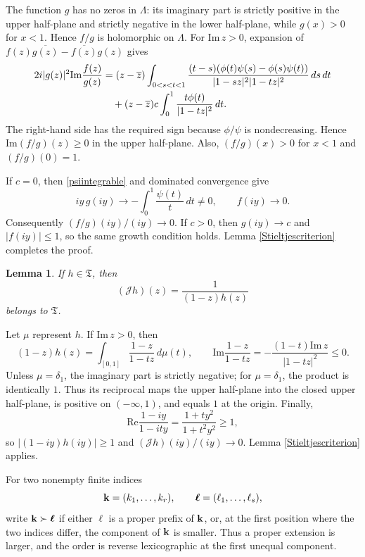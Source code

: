 \documentclass[12pt,a4paper]{amsart}
\makeatletter
\numberwithin{equation}{section}
\renewenvironment{proof}[1][Proof]{%
  \par\pushQED{\qed}%
  \normalfont\topsep6\p@\@plus6\p@\relax
  \trivlist
  \item[\hskip\labelsep\bfseries #1:]\ignorespaces
}{%
  \popQED\endtrivlist\@endpefalse
}
\theoremstyle{plain}
\newtheorem{lem}[Thm]{Lemma}
\theoremstyle{definition}
\makeatother
\begin{document}
\begin{proof}
The function $g$ has no zeros in $\Lambda$: its imaginary part is strictly positive in the upper half-plane and strictly negative in the lower half-plane, while $g(x)>0$ for $x<1$.  Hence $f/g$ is holomorphic on $\Lambda$.  For $\mathrm{Im}\,z>0$, expansion of
$f(z)\overline{g(z)}-\overline{f(z)}g(z)$ gives
\begin{align}
2i|g(z)|^2\mathrm{Im}\frac{f(z)}{g(z)}
&=(z-\overline z)
\int_{0<s<t<1}
\frac{(t-s)(\phi(t)\psi(s)-\phi(s)\psi(t))}
{|1-sz|^2|1-tz|^2}\,ds\,dt\notag\\
&\quad +(z-\overline z)c
\int_0^1\frac{t\phi(t)}{|1-tz|^2}\,dt.\label{pickquotient}
\end{align}
The right-hand side has the required sign because $\phi/\psi$ is nondecreasing.  Hence $\mathrm{Im}(f/g)(z)\geq 0$ in the upper half-plane.  Also, $(f/g)(x)>0$ for $x<1$ and $(f/g)(0)=1$.

If $c=0$, then \eqref{psiintegrable} and dominated convergence give
\[
iy\,g(iy)\longrightarrow-\int_0^1\frac{\psi(t)}t\,dt\neq 0,
\qquad f(iy)\longrightarrow 0.
\]
Consequently $(f/g)(iy)/(iy)\rightarrow 0$.  If $c>0$, then $g(iy)\rightarrow c$ and $|f(iy)|\leq 1$, so the same growth condition holds.  Lemma \ref{Stieltjescriterion} completes the proof.
\end{proof}

\begin{lem}\label{involution}
If $h\in\mathfrak{T}$, then
\begin{equation}\label{Jdef}
(\mathcal{J}h)(z)=\frac1{(1-z)h(z)}
\end{equation}
belongs to $\mathfrak{T}$.
\end{lem}

\begin{proof}
Let $\mu$ represent $h$.  If $\mathrm{Im}\,z>0$, then
\[
(1-z)h(z)=\int_{[0,1]}\frac{1-z}{1-tz}\,d\mu(t),
\qquad
\mathrm{Im}\frac{1-z}{1-tz}
=-\frac{(1-t)\mathrm{Im}\,z}{|1-tz|^2}\leq 0.
\]
Unless $\mu=\delta_1$, the imaginary part is strictly negative; for $\mu=\delta_1$, the product is identically $1$.  Thus its reciprocal maps the upper half-plane into the closed upper half-plane, is positive on $(-\infty,1)$, and equals $1$ at the origin.  Finally,
\[
\mathrm{Re}\frac{1-iy}{1-ity}
=\frac{1+ty^2}{1+t^2y^2}\geq 1,
\]
so $|(1-iy)h(iy)|\geq 1$ and $(\mathcal{J}h)(iy)/(iy)\rightarrow 0$.  Lemma \ref{Stieltjescriterion} applies.
\end{proof}

For two nonempty finite indices
\[
{\bf k}=(k_1,\ldots,k_r),
\qquad
{\boldsymbol\ell}=(\ell_1,\ldots,\ell_s),
\]
write ${\bf k}\succ{\boldsymbol\ell}$ if either ${\boldsymbol\ell}$ is a proper prefix of ${\bf k}$, or, at the first position where the two indices differ, the component of ${\bf k}$ is smaller.  Thus a proper extension is larger, and the order is reverse lexicographic at the first unequal component.
\end{document}

